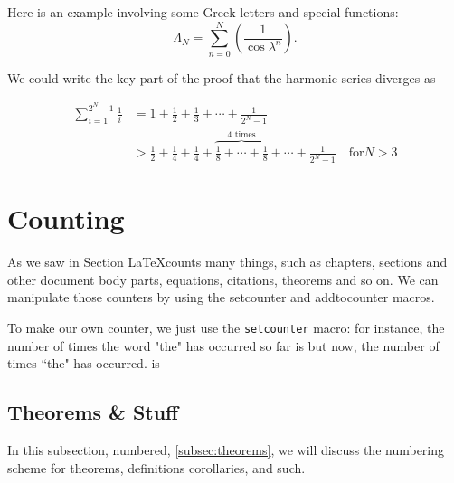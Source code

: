 \documentclass[12pt, leqno]{article}
\numberwithin{equation}{section}
\numberwithin{figure}{section}
\begin{document}
Here is an example involving some Greek letters and special functions: 
$$  
\Lambda_N = 
\sum_{n=0}^{N}\left(\frac{1}{\cos\lambda^n}\right).
$$  

We could write the key part of the proof that the harmonic series diverges as 


\begin{align}
\sum_{i=1}^{2^N-1}
\frac{1}{i} &= 1 + \frac{1}{2} + \frac{1}{3} + \cdots + \frac{1}{2^N-1}\\
&> \frac{1}{2} + \frac{1}{4} + \frac{1}{4} + 
\overbrace{\frac{1}{8} + \cdots + \frac{1}{8}}^{\text{4 times}} +
\cdots + \frac{1}{2^N-1} \quad \text{for} N > 3
\end{align}


\section*{Counting} 
As we saw in Section %
\LaTeX counts many things, such as chapters, sections and other document body parts, equations, 
citations, theorems and so on. We can manipulate those counters by using the setcounter and addtocounter macros. 

To make our own counter, we just use the \texttt{setcounter} macro: 
\setcounter{numberthes}{42}
for instance, the number of times the word "the" has occurred so far is 
 but now, the number of times ``the" has occurred. is 
\addtocounter{numberthes}{2}


\subsection*{Theorems \& Stuff}
\label{subsec:theorems}
In this subsection, numbered, \ref{subsec:theorems}, we will discuss the numbering scheme for theorems, definitions corollaries, and such. 

\newtheorem{theorem}{Theorem}[section] %
\newtheorem{definition}[theorem]{Definition}

\newtheorem{lemma}[theorem]{Lemma} %
\end{document}

